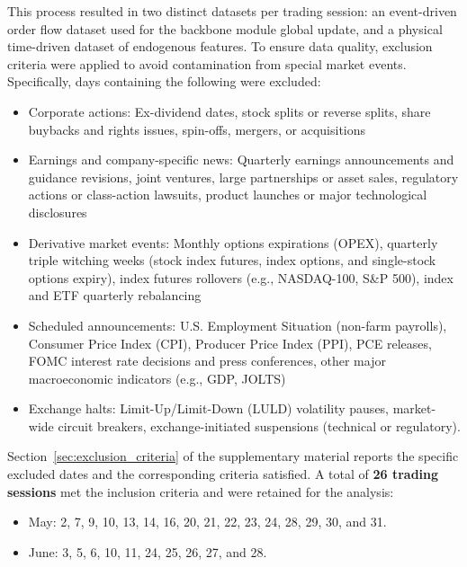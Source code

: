 \documentclass[10pt,a4paper,oneside]{article}
\begin{document}
This process resulted in two distinct datasets per trading session: an event-driven order flow dataset used for the backbone module global update, and a physical time-driven dataset of endogenous features. To ensure data quality, exclusion criteria were applied to avoid contamination from special market events. Specifically, days containing the following were excluded:


\begin{itemize}
    \item Corporate actions: Ex-dividend dates, stock splits or reverse splits, share buybacks and rights issues, spin-offs, mergers, or acquisitions
    \item Earnings and company-specific news: Quarterly earnings announcements and guidance revisions, joint ventures, large partnerships or asset sales, regulatory actions or class-action lawsuits, product launches or major technological disclosures
    \item Derivative market events: Monthly options expirations (OPEX), quarterly triple witching weeks (stock index futures, index options, and single-stock options expiry), index futures rollovers (e.g., NASDAQ-100, S\&P 500), index and ETF quarterly rebalancing
    \item Scheduled announcements: U.S. Employment Situation (non-farm payrolls), Consumer Price Index (CPI), Producer Price Index (PPI), PCE releases, FOMC interest rate decisions and press conferences, other major macroeconomic indicators (e.g., GDP, JOLTS)
    \item Exchange halts: Limit-Up/Limit-Down (LULD) volatility pauses, market-wide circuit breakers, exchange-initiated suspensions (technical or regulatory).
\end{itemize}

Section~\ref{sec:exclusion_criteria} of the supplementary material reports the specific excluded dates and the corresponding criteria satisfied. A total of \textbf{26 trading sessions} met the inclusion criteria and were retained for the analysis:

\begin{itemize}
    \item May: 2, 7, 9, 10, 13, 14, 16, 20, 21, 22, 23, 24, 28, 29, 30, and 31.
    \item June: 3, 5, 6, 10, 11, 24, 25, 26, 27, and 28.
\end{itemize}


\end{document}

